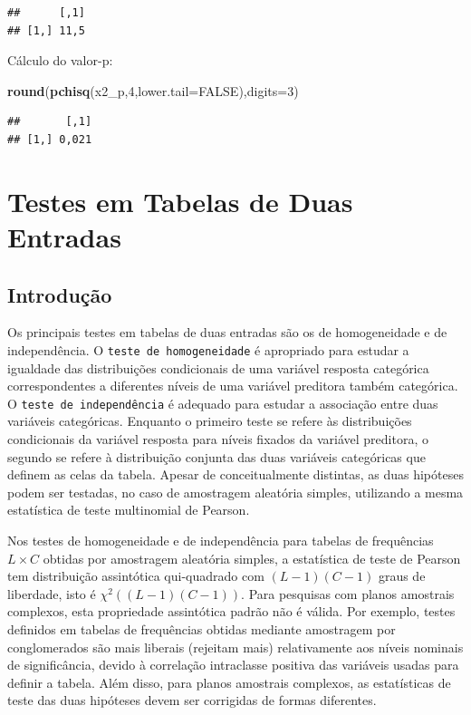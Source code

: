 \documentclass[]{book}
\newenvironment{Shaded}{\begin{snugshade}}{\end{snugshade}}
\newcommand{\KeywordTok}[1]{\textcolor[rgb]{0.13,0.29,0.53}{\textbf{#1}}}
\newcommand{\DataTypeTok}[1]{\textcolor[rgb]{0.13,0.29,0.53}{#1}}
\newcommand{\DecValTok}[1]{\textcolor[rgb]{0.00,0.00,0.81}{#1}}
\newcommand{\OtherTok}[1]{\textcolor[rgb]{0.56,0.35,0.01}{#1}}
\newcommand{\NormalTok}[1]{#1}
\theoremstyle{definition}
\theoremstyle{definition}
\theoremstyle{definition}
\theoremstyle{remark}
\begin{document}
\begin{verbatim}
##      [,1]
## [1,] 11,5
\end{verbatim}

Cálculo do valor-p:

\begin{Shaded}
\begin{Highlighting}[]
\KeywordTok{round}\NormalTok{(}\KeywordTok{pchisq}\NormalTok{(x2_p,}\DecValTok{4}\NormalTok{,}\DataTypeTok{lower.tail=}\OtherTok{FALSE}\NormalTok{),}\DataTypeTok{digits=}\DecValTok{3}\NormalTok{)}
\end{Highlighting}
\end{Shaded}

\begin{verbatim}
##       [,1]
## [1,] 0,021
\end{verbatim}

\chapter{Testes em Tabelas de Duas Entradas}\label{testetab2}

\section{Introdução}\label{introducao-2}

Os principais testes em tabelas de duas entradas são os de homogeneidade
e de independência. O \texttt{teste\ de\ homogeneidade} é apropriado
para estudar a igualdade das distribuições condicionais de uma variável
resposta categórica correspondentes a diferentes níveis de uma variável
preditora também categórica. O \texttt{teste\ de\ independência} é
adequado para estudar a associação entre duas variáveis categóricas.
Enquanto o primeiro teste se refere às distribuições condicionais da
variável resposta para níveis fixados da variável preditora, o segundo
se refere à distribuição conjunta das duas variáveis categóricas que
definem as celas da tabela. Apesar de conceitualmente distintas, as duas
hipóteses podem ser testadas, no caso de amostragem aleatória simples,
utilizando a mesma estatística de teste multinomial de Pearson.

Nos testes de homogeneidade e de independência para tabelas de
frequências \(L\times C\) obtidas por amostragem aleatória simples, a
estatística de teste de Pearson tem distribuição assintótica
qui-quadrado com \((L-1)(C-1)\) graus de liberdade, isto é
\(\chi ^{2}\left( (L-1)(C-1)\right)\). Para pesquisas com planos
amostrais complexos, esta propriedade assintótica padrão não é válida.
Por exemplo, testes definidos em tabelas de frequências obtidas mediante
amostragem por conglomerados são mais liberais (rejeitam mais)
relativamente aos níveis nominais de significância, devido à correlação
intraclasse positiva das variáveis usadas para definir a tabela. Além
disso, para planos amostrais complexos, as estatísticas de teste das
duas hipóteses devem ser corrigidas de formas diferentes.
\end{document}
